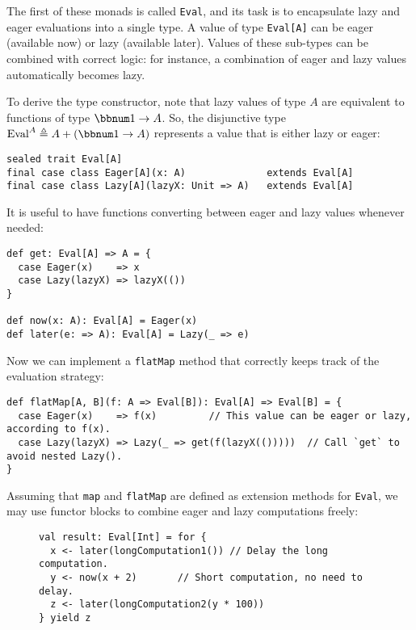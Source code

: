 The first of these monads is called \lstinline!Eval!, and its task
is to encapsulate lazy and eager evaluations into a single type. A
value of type \lstinline!Eval[A]! can be eager (available now) or
lazy (available later). Values of these sub-types can be combined
with correct logic: for instance, a combination of eager and lazy
values automatically becomes lazy.

To derive the type constructor, note that lazy values of type $A$
are equivalent to functions of type $\bbnum 1\rightarrow A$. So,
the disjunctive type $\text{Eval}^{A}\triangleq A+\left(\bbnum 1\rightarrow A\right)$
represents a value that is either lazy or eager:
\begin{lstlisting}
sealed trait Eval[A]
final case class Eager[A](x: A)              extends Eval[A]
final case class Lazy[A](lazyX: Unit => A)   extends Eval[A]
\end{lstlisting}
It is useful to have functions converting between eager and lazy values
whenever needed:
\begin{lstlisting}
def get: Eval[A] => A = {
  case Eager(x)    => x
  case Lazy(lazyX) => lazyX(())
}

def now(x: A): Eval[A] = Eager(x)
def later(e: => A): Eval[A] = Lazy(_ => e)
\end{lstlisting}
Now we can implement a \lstinline!flatMap! method that correctly
keeps track of the evaluation strategy:
\begin{lstlisting}
def flatMap[A, B](f: A => Eval[B]): Eval[A] => Eval[B] = {
  case Eager(x)    => f(x)         // This value can be eager or lazy, according to f(x).
  case Lazy(lazyX) => Lazy(_ => get(f(lazyX(()))))  // Call `get` to avoid nested Lazy().
}
\end{lstlisting}
Assuming that \lstinline!map! and \lstinline!flatMap! are defined
as extension methods for \lstinline!Eval!, we may use functor blocks
to combine eager and lazy computations freely:

\begin{wrapfigure}{l}{0.631\columnwidth}%
\vspace{-0.8\baselineskip}
\begin{lstlisting}
val result: Eval[Int] = for {
  x <- later(longComputation1()) // Delay the long computation.
  y <- now(x + 2)       // Short computation, no need to delay.
  z <- later(longComputation2(y * 100))
} yield z
\end{lstlisting}

\vspace{-1\baselineskip}
\end{wrapfigure}%

